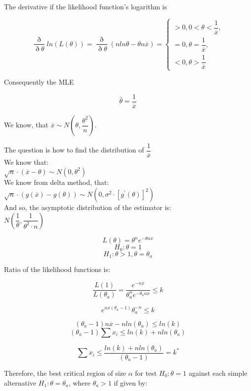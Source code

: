 \documentclass[12pt]{article}
\begin{document}
\begin{list}{()~}{}
The derivative if the likelihood function's logarithm is

\[\dfrac{\eth}{\eth \theta}ln\left(L\left(\theta\right)\right)=\dfrac{\eth}{\eth \theta}\left(n ln\theta-\theta n \overline{x}\right)=\left\{
\begin{array}{l}
>0, 0 < \theta < \dfrac{1}{\overline{x}},\\
=0, \theta=\dfrac{1}{\overline{x}},\\
<0, \theta > \dfrac{1}{\overline{x}}
\end{array} \right. \]

Consequently the MLE

\[\hat{\theta}=\dfrac{1}{\overline{x}}\]

We know, that $ \overline{x} \sim N\left(\theta, \dfrac{\theta^2}{n}\right)$.

The question is how to find the distribution of $\dfrac{1}{\overline{x}}$\\
We know that: \\
$\sqrt{n} \cdot \left(\overline{x} - \theta\right) \sim N(0, \theta^2)$\\
We know from delta method, that:\\
$\sqrt{n} \cdot \left( g(\overline{x}) - g(\theta) \right) \sim N(0, \sigma^2 \cdot \left[ g^{'}(\theta) \right]^2)$\\
And so, the asymptotic distribution of the estimator is:\\
$N( \dfrac{1}{\theta}, \dfrac{1}{\theta^2 \cdot n})$

\item
\[L\left(\theta\right)=\theta^n e^{-\theta n \overline{x}}\]
\[H_0: \theta = 1\]
\[H_1: \theta>1, \theta = \theta_a\]

Ratio of the likelihood functions is:

\[\dfrac{L\left(1\right)}{L\left(\theta_a\right)}=\dfrac{e^{-n\overline{x}}}{\theta_a^n e^{-\theta_a n \overline{x}}}\leq k\]

\[e^{n\overline{x}\left(\theta_a-1\right)}\theta_a^{-n}\leq k\]

\[\left(\theta_a-1\right)n\overline{x}-n ln\left(\theta_a\right)\leq ln(k)\]
\[\left(\theta_a-1\right)\sum x_i \leq ln\left(k\right)+nln\left(\theta_a\right)\]

\[\sum x_i \leq \dfrac{ln\left(k\right)+nln\left(\theta_a\right)}{\left(\theta_a-1\right)}=k^*\]

Therefore,  the best critical region of size $\alpha$ for test $H_0: \theta=1$ against each simple alternative $H_1: \theta=\theta_a$, where $\theta_a>1$ if given by:


\end{list}
\end{document}
